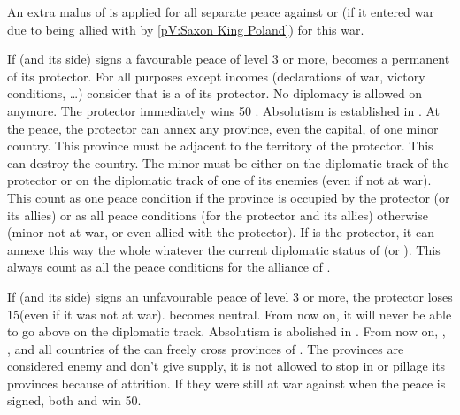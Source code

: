 \phpaix
\aparag An extra malus of  is applied for all separate peace against
\payspologne or \payssaxe (if it entered war due to being allied with
\payspologne by \ref{pV:Saxon King Poland}) for this war.
\begin{digressions}


  \aparag If \payspologne (and its side) signs a favourable peace of level 3
  or more, \payspologne becomes a permanent \EG of its protector.
  \bparag For all purposes except incomes (declarations of war, victory
  conditions, \ldots) consider that \payspologne is a \VASSAL of its
  protector.
  \bparag No diplomacy is allowed on \payspologne anymore.
  \bparag The protector immediately wins 50 \VP.
  \aparag Absolutism is established in \payspologne.
  \aparag At the peace, the protector can annex any province, even the
  capital, of one minor country.
  \bparag This province must be adjacent to the territory of the protector.
  \bparag This can destroy the country.
  \bparag The minor must be either on the diplomatic track of the protector or
  on the diplomatic track of one of its enemies (even if not at war).
  \bparag This count as one peace condition if the province is occupied by the
  protector (or its allies) or as all peace conditions (for the protector and
  its allies) otherwise (minor not at war, or even allied with the protector).
  \bparag If \SUE is the protector, it can annexe this way the whole
  \regionNorvege whatever the current diplomatic status of \paysdanemark (or
  \paysVnorvege). This always count as all the peace conditions for the
  alliance of \SUE.


  \aparag If \payspologne (and its side) signs an unfavourable peace of level
  3 or more, the protector loses 15\VP (even if it was not at war).
  \bparag \payspologne becomes neutral. From now on, it will never be able to
  go above \SUB on the diplomatic track.
  \bparag Absolutism is abolished in \payspologne.
  \aparag From now on, \RUS, \AUS, \PRU and all countries of the \HRE can
  freely cross provinces of \payspologne. The provinces are considered enemy
  and don't give supply, it is not allowed to stop in \payspologne or pillage
  its provinces because of attrition.
  \aparag If they were still at war against \payspologne when the peace is
  signed, both \RUS and \AUS win 50\VP.



\end{digressions}
